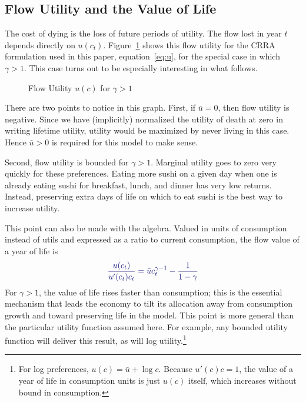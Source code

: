 \documentclass[12pt,twoside]{article}
\newcommand{\clr}[1]{{\color{ChadBlue} #1}}
\begin{document}
\subsection{Flow Utility and the Value of Life}

The cost of dying is the loss of future periods of utility. The flow
lost in year $t$ depends directly on $u(c_t)$. Figure~\ref{fig:u} shows
this flow utility for the CRRA formulation used in this paper,
equation~\eqref{eq:u}, for the special case in which $\gamma>1$.  This
case turns out to be especially interesting in what follows.
\begin{figure}[tp]
\caption{Flow Utility $u(c)$ for $\gamma>1$}
\label{fig:u}
\end{figure} 
There are two points to notice in this graph. First, if $\bar{u}=0$,
then flow utility is negative. Since we have (implicitly) normalized the
utility of death at zero in writing lifetime utility, utility would be
maximized by never living in this case. Hence $\bar{u}>0$ is required
for this model to make sense.

Second, flow utility is bounded for $\gamma>1$. Marginal utility goes to
zero very quickly for these preferences. Eating more sushi on a given
day when one is already eating sushi for breakfast, lunch, and dinner
has very low returns. Instead, preserving extra days of life on which to
eat sushi is the best way to increase utility.

This point can also be made with the algebra. Valued in units of
consumption instead of utils and expressed as a ratio to current
consumption, the flow value of a year of life is
\begin{equation}
 \clr{ \frac{u(c_t)}{u'(c_t) c_t} = \bar{u} c_t ^{\gamma-1} -
   \frac{1}{1-\gamma} }
\end{equation}
For $\gamma>1$, the value of life rises faster than consumption; this is
the essential mechanism that leads the economy to tilt its allocation
away from consumption growth and toward preserving life in the model.
This point is more general than the particular utility function assumed
here. For example, any bounded utility function will deliver this
result, as will log utility.\footnote{For log preferences,
  $u(c)=\bar{u}+\log c$. Because $u'(c)c=1$, the value of a year of life
  in consumption units is just $u(c)$ itself, which increases without
  bound in consumption.}
\end{document}
